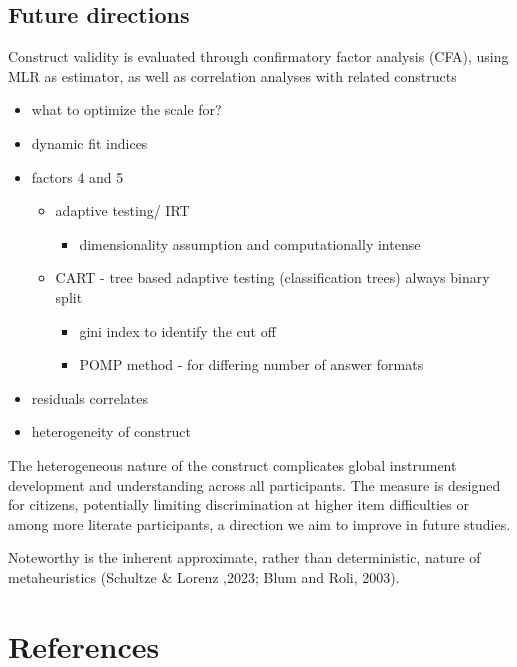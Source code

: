 \documentclass[
  12pt,
  a4paper,
  twoside]{article}
\providecommand{\tightlist}{%
  \setlength{\itemsep}{0pt}\setlength{\parskip}{0pt}}
\begin{document}
\subsection{Future directions}\label{future-directions}

Construct validity is evaluated through confirmatory factor analysis (CFA), using MLR as estimator, as well as correlation analyses with related constructs

\begin{itemize}
\tightlist
\item
  what to optimize the scale for?
\item
  dynamic fit indices
\item
  factors 4 and 5

  \begin{itemize}
  \tightlist
  \item
    adaptive testing/ IRT

    \begin{itemize}
    \tightlist
    \item
      dimensionality assumption and computationally intense
    \end{itemize}
  \item
    CART - tree based adaptive testing (classification trees) always binary split

    \begin{itemize}
    \tightlist
    \item
      gini index to identify the cut off
    \item
      POMP method - for differing number of answer formats
    \end{itemize}
  \end{itemize}
\item
  residuals correlates
\item
  heterogeneity of construct
\end{itemize}

The heterogeneous nature of the construct complicates global instrument development and understanding across all participants. The measure is designed for citizens, potentially limiting discrimination at higher item difficulties or among more literate participants, a direction we aim to improve in future studies.

Noteworthy is the inherent approximate, rather than deterministic, nature of metaheuristics (Schultze \& Lorenz ,2023; Blum and Roli, 2003).

\section*{References}\label{references}
\end{document}
